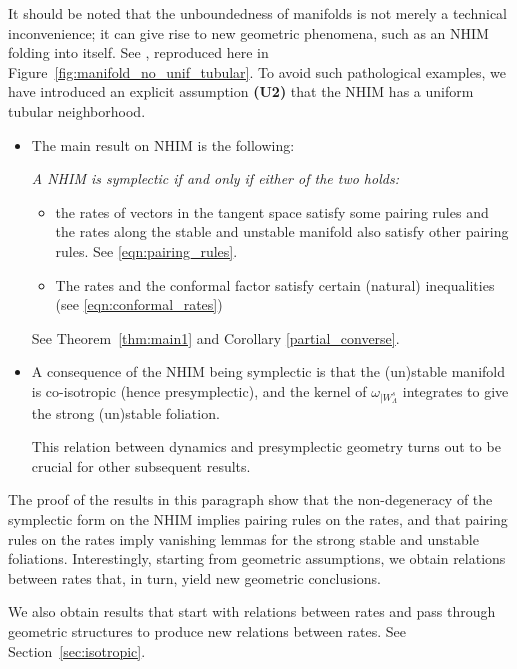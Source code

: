 \documentclass[11pt]{amsart}
\theoremstyle{definition}
\theoremstyle{remark}
\numberwithin{equation}{section}
\begin{document}
   It should be noted that the unboundedness of manifolds is not merely a technical inconvenience;
   it can give rise to new geometric phenomena, such as an NHIM folding into itself.
   See \cite[Example~3.8]{Eldering12},
   reproduced here in Figure~\ref{fig:manifold_no_unif_tubular}.
   To avoid such pathological examples, we have introduced an explicit assumption {\bf (U2)}
   that the NHIM has a uniform tubular neighborhood.







     \begin{itemize}
     \item
     The main result on NHIM is the following:

     \medskip

     \emph{A NHIM is symplectic if and only if either of the two holds:}
     \begin{itemize}
     \item
     the rates of vectors in the tangent space satisfy some
     pairing rules and the rates along the stable and unstable manifold
     also satisfy other pairing rules. See \eqref{eqn:pairing_rules}.
\item
The rates
 and the conformal factor satisfy certain (natural) inequalities (see \eqref{eqn:conformal_rates})
\end{itemize}
     \medskip

     See Theorem~\ref{thm:main1} and Corollary \ref{partial_converse}.
\medskip
   \item
     A
     consequence of the  NHIM being symplectic is that
     the (un)stable manifold is co-isotropic (hence presymplectic),
     and the kernel of
     $\omega_{\mid W^s_\Lambda}$ integrates to give the strong (un)stable foliation.

     This relation between
     dynamics and  presymplectic geometry  turns out to be crucial for  other subsequent results.
\end{itemize}

\medskip
     The  proof of the results in this paragraph  show that the non-degeneracy of the symplectic form on the NHIM implies pairing rules on the rates, and
     that   pairing rules on the rates imply vanishing lemmas for the
     strong stable and unstable foliations. Interestingly, starting from geometric assumptions, we obtain relations between rates that, in turn, yield new geometric conclusions.


     We also obtain results that  start with relations between rates  and pass through geometric structures to produce new relations between rates.
     See Section~\ref{sec:isotropic}.
\end{document}
